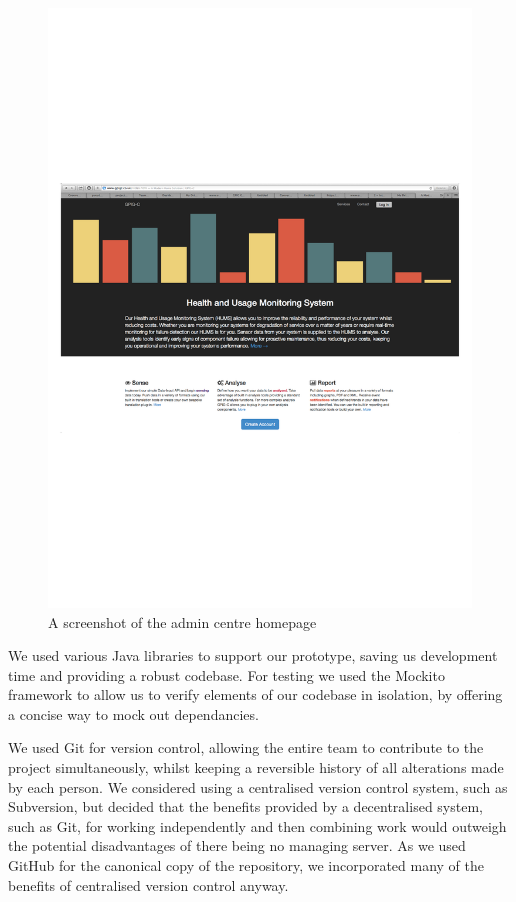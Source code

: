 \documentclass[10pt,a4paper]{article}
\begin{document}
\begin{figure}[htbp!]
  \centering
  \includegraphics[width=15cm]{images/admin.pdf}
  \caption{A screenshot of the admin centre homepage}
  \label{fig:admin}
\end{figure}

We used various Java libraries to support our prototype, saving us 
development time and providing a robust codebase. For testing we used 
the Mockito framework to allow us to verify elements of our codebase in 
isolation, by offering a concise way to mock out dependancies.

We used Git for version control, allowing the entire team to
contribute to the project simultaneously, whilst keeping a reversible
history of all alterations made by each person. We considered using a
centralised version control system, such as Subversion, but decided that the
benefits provided by a decentralised system, such as Git, for working
independently and then combining work would outweigh the potential
disadvantages of there being no managing server. As we used GitHub for the
canonical copy of the repository, we incorporated many of the benefits of centralised
version control anyway.
\end{document}
